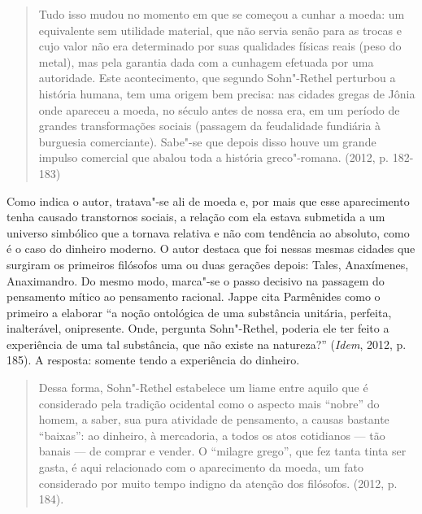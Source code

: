 \begin{quote}
Tudo isso mudou no momento em que se começou a cunhar a moeda: um
equivalente sem utilidade material, que não servia senão para as trocas
e cujo valor não era determinado por suas qualidades físicas reais (peso
do metal), mas pela garantia dada com a cunhagem efetuada por uma
autoridade. Este acontecimento, que segundo Sohn"-Rethel perturbou a
história humana, tem uma origem bem precisa: nas cidades gregas de Jônia
onde apareceu a moeda, no século  antes de nossa era, em um período
de grandes transformações sociais (passagem da feudalidade fundiária à
burguesia comerciante). Sabe"-se que depois disso houve um grande impulso
comercial que abalou toda a história greco"-romana. (2012, p. 182-183)
\end{quote}

Como indica o autor, tratava"-se ali de moeda e, por mais que esse
aparecimento tenha causado transtornos sociais, a relação com ela estava
submetida a um universo simbólico que a tornava relativa e não com
tendência ao absoluto, como é o caso do dinheiro moderno. O autor
destaca que foi nessas mesmas cidades que surgiram os primeiros
filósofos uma ou duas gerações depois: Tales, Anaxímenes, Anaximandro.
Do mesmo modo, marca"-se o passo decisivo na passagem do pensamento
mítico ao pensamento racional. Jappe cita Parmênides como o primeiro a
elaborar ``a noção ontológica de uma substância unitária, perfeita,
inalterável, onipresente. Onde, pergunta Sohn"-Rethel, poderia ele ter
feito a experiência de uma tal substância, que não existe na natureza?''
(\emph{Idem}, 2012, p. 185). A resposta: somente tendo a experiência do
dinheiro.

\begin{quote}
Dessa forma, Sohn"-Rethel estabelece um liame entre aquilo que é
considerado pela tradição ocidental como o aspecto mais ``nobre'' do
homem, a saber, sua pura atividade de pensamento, a causas bastante
``baixas'': ao dinheiro, à mercadoria, a todos os atos cotidianos ---
tão banais --- de comprar e vender. O ``milagre grego'', que fez tanta
tinta ser gasta, é aqui relacionado com o aparecimento da moeda, um fato
considerado por muito tempo indigno da atenção dos filósofos. (2012, p.
184).
\end{quote}

